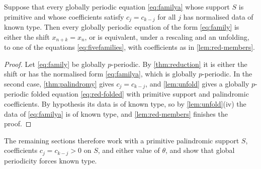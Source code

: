 \begin{corollary}
\label{cor:red-primitive}
Suppose that every globally periodic equation \eqref{eq:familya} whose support
$S$ is primitive and whose coefficients satisfy $c_j=c_{k-j}$ for all $j$ has
normalised data of known type. Then every globally periodic equation of the
form \eqref{eq:family} is either the shift $x_{n+k}=x_n$, or is equivalent,
under a rescaling and an unfolding, to one of the equations
\eqref{eq:fivefamilies}, with coefficients as in \autoref{lem:red-members}.
\end{corollary}

\begin{proof}
Let \eqref{eq:family} be globally $p$-periodic. By \autoref{thm:reduction} it
is either the shift or has the normalised form \eqref{eq:familya}, which is
globally $p$-periodic. In the second case, \autoref{thm:palindromy} gives
$c_j=c_{k-j}$, and \autoref{lem:unfold} gives a globally $p$-periodic folded
equation \eqref{eq:red-folded} with primitive support and palindromic
coefficients. By hypothesis its data is of known type, so by
\autoref{lem:unfold}(iv) the data of \eqref{eq:familya} is of known type, and
\autoref{lem:red-members} finishes the proof.
\end{proof}

The remaining sections therefore work with a primitive palindromic support
$S$, coefficients $c_j=c_{k-j}>0$ on $S$, and either value of $\theta$, and
show that global periodicity forces known type.
